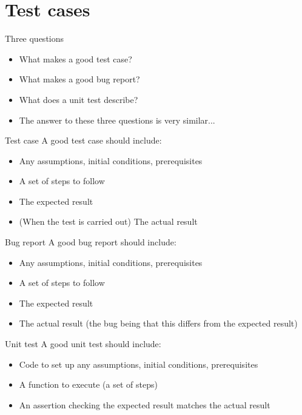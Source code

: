 \part{Test cases}
\frame{\partpage}

\begin{frame}{Three questions}
    \begin{itemize}
        \pause\item What makes a good test case?
        \pause\item What makes a good bug report?
        \pause\item What does a unit test describe?
        \pause\item The answer to these three questions is very similar...
    \end{itemize}
\end{frame}

\begin{frame}{Test case}
    \pause A good test case should include:
    \begin{itemize}
        \pause\item Any assumptions, initial conditions, prerequisites
        \pause\item A set of steps to follow
        \pause\item The expected result
        \pause\item (When the test is carried out) The actual result
    \end{itemize}
\end{frame}

\begin{frame}{Bug report}
    \pause A good bug report should include:
    \begin{itemize}
        \pause\item Any assumptions, initial conditions, prerequisites
        \pause\item A set of steps to follow
        \pause\item The expected result
        \pause\item The actual result (the bug being that this differs from the expected result)
    \end{itemize}
\end{frame}

\begin{frame}{Unit test}
    \pause A good unit test should include:
    \begin{itemize}
        \pause\item Code to set up any assumptions, initial conditions, prerequisites
        \pause\item A function to execute (a set of steps)
        \pause\item An assertion checking the expected result matches the actual result
    \end{itemize}
\end{frame}


